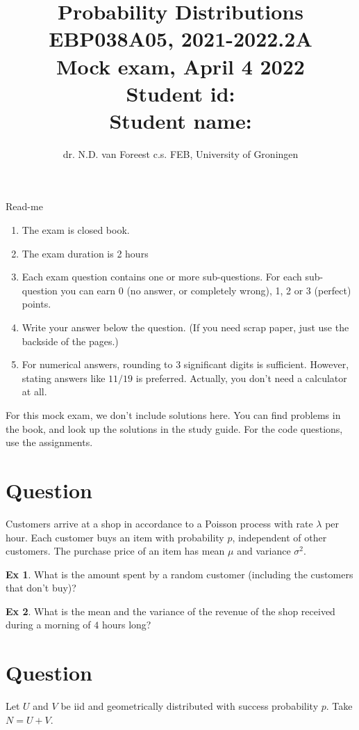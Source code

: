 \documentclass[12pt]{article}
\title{
Probability Distributions \\
EBP038A05, 2021-2022.2A\\
Mock exam, April 4 2022\\
Student id: {} \\
Student name: {} \\
}
\author{dr. N.D. van Foreest c.s.
FEB, University of Groningen
}
\date{}
\theoremstyle{definition}
\newtheorem{exercise}{Ex}[section]
\newcommand{\1}[1]{\,I_{#1}} %
\begin{document}
\maketitle
{\LARGE Read-me}

\begin{enumerate}
\item The exam is closed book.
\item The exam duration is 2 hours
\item Each exam question contains one or more sub-questions. For each sub-question you can earn 0 (no answer, or completely wrong), 1, 2 or 3 (perfect) points.
\item Write your answer below the question. (If you need scrap paper, just use the backside of the pages.)
\item For numerical answers, rounding to 3 significant digits is sufficient. However, stating answers like $11/19$ is preferred. Actually, you don't need a calculator at all.
\end{enumerate}

For this mock exam, we don't include solutions here.
You can find problems in  the book, and look up the solutions in the study guide. For the code questions, use the assignments.


\section{Question}

Customers arrive at a shop in accordance to a Poisson process with rate \(\lambda\) per hour. Each customer buys an item with probability \(p\), independent of other customers.  The purchase price of an item has mean \(\mu\) and variance \(\sigma^{2}\).


\begin{exercise}
What is the amount spent by a random customer (including the customers that don't buy)?
\end{exercise}

\begin{exercise}
What is the mean and the variance of the revenue of the shop received during a morning of \(4\) hours long?
\end{exercise}


\section{Question}

Let \(U\) and \(V\) be iid and geometrically distributed with success probability \(p\). Take \(N=U+V\).
\end{document}
